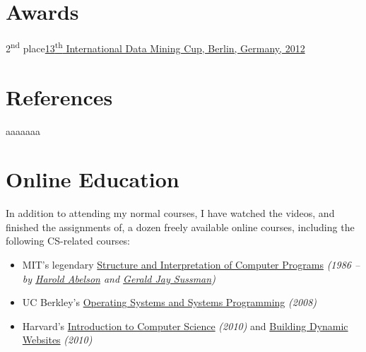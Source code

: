 \documentclass{tccv}
\begin{document}
{{\begin{project_list}
\end{project_list}




\vspace{-20pt}




\section{Awards}

\begin{factlist}
\item{2\textsuperscript{nd} place}{\href{http://www.data-mining-cup.de/en/review/dmc-2012/}{13\textsuperscript{th} International Data Mining Cup, Berlin, Germany, 2012}}
\end{factlist}


\section{References}

\begin{factlist}
aaaaaaa
\end{factlist}




\newpage


\section{Online Education}

In addition to attending my normal courses, I have watched the videos, and finished the assignments of, a dozen freely available online courses, including the following CS-related courses:

\begin{itemize}

\item MIT's legendary \href{http://groups.csail.mit.edu/mac/classes/6.001/abelson-sussman-lectures/}{Structure and Interpretation of Computer Programs} {\it(1986 -- by \href{https://en.wikipedia.org/wiki/Hal_Abelson}{Harold Abelson} and \href{https://en.wikipedia.org/wiki/Gerald_Jay_Sussman}{Gerald Jay Sussman})}

\item UC Berkley's \href{http://www.cs.berkeley.edu/~kubitron/courses/cs162-F08/}{Operating Systems and Systems Programming} {\it(2008)}

\item Harvard's \href{http://cs50.tv/2010/fall/}{Introduction to Computer Science} {\it(2010)} and \href{http://cs75.tv/2010/fall/}{Building Dynamic Websites} {\it(2010)}


\end{itemize}}}
\end{document}
